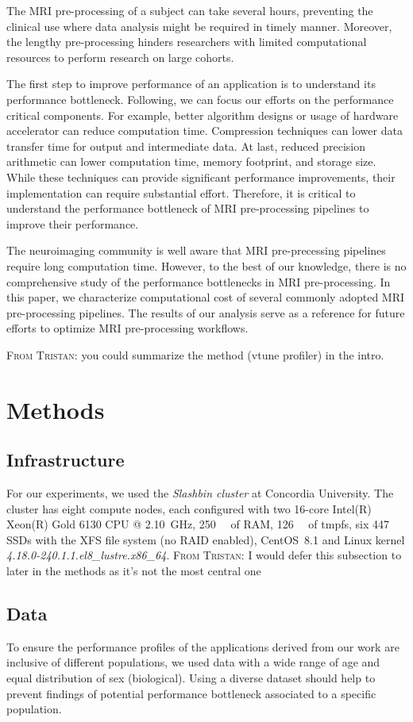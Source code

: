 \documentclass[conference]{IEEEtran}
\newcommand{\TG}[1]{\color{blue}\textsc{From Tristan: }#1\color{black}}
\begin{document}
The MRI pre-processing of a subject can take several hours, preventing the clinical use where data analysis might be required in timely manner. Moreover, the lengthy pre-processing hinders researchers with limited computational resources to perform research on large cohorts.

The first step to improve performance of an application is to understand its performance bottleneck. Following, we can focus our efforts on the performance critical components. For example, better algorithm designs or usage of hardware accelerator can reduce computation time. Compression techniques can lower data transfer time for output and intermediate data. At last, reduced precision arithmetic can lower computation time, memory footprint, and storage size. While these techniques can provide significant performance improvements, their implementation can require substantial effort. Therefore, it is critical to understand the performance bottleneck of MRI pre-processing pipelines to improve their performance.

The neuroimaging community is well aware that MRI pre-precessing pipelines require long computation time. However, to the best of our knowledge, there is no comprehensive study of the performance bottlenecks in MRI pre-processing. In this paper, we characterize computational cost of several commonly adopted MRI pre-processing pipelines. The results of our analysis serve as a reference for future efforts to optimize MRI pre-processing workflows.

\TG{you could summarize the method (vtune profiler) in the intro.}

\section{Methods}
\subsection{Infrastructure}
For our experiments, we used the \textit{Slashbin cluster} at Concordia University. The cluster has eight compute nodes, each configured with two 16-core Intel(R) Xeon(R) Gold 6130 CPU @ \SI{2.10}{\giga\hertz}, \SI{250}{\gibi\byte} of RAM, \SI{126}{\gibi\byte} of tmpfs, six \SI{447}{\gibi\byte} SSDs with the XFS file system (no RAID enabled), CentOS~8.1 and Linux kernel \textit{4.18.0-240.1.1.el8\_lustre.x86\_64}. \TG{I would defer this subsection to later in the methods as it's not the most central one}

\subsection{Data}
To ensure the performance profiles of the applications derived from our work are inclusive of different populations, we used data with a wide range of age and equal distribution of sex (biological). Using a diverse dataset should help to prevent findings of potential performance bottleneck associated to a specific population.
\end{document}
